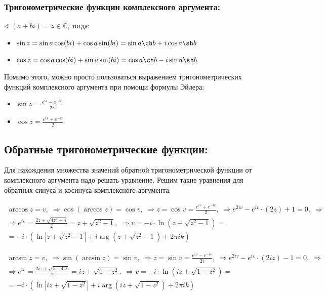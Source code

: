 \documentclass{article}
\begin{document}
\subsubsection{Тригонометрические функции комплексного аргумента:}

$\sphericalangle \: (a + bi) = z \in \mathbb{C}$, тогда:
\begin{itemize}
	\item $\sin z = \sin a \cos (bi) + \cos a \sin (bi) = \sin a \ch b + i\cos a \sh b$
	\item $\cos z = \cos a \cos (bi) + \sin a \sin (bi) = \cos a \ch b - i\sin a \sh b$
\end{itemize}


Помимо этого, можно просто пользоваться выражением тригонометрических функций комплексного аргумента при помощи формулы Эйлера:

\begin{itemize}
	\item $\sin z = \frac{e^{iz} - e^{-iz}}{2i}$
	\item $\cos z = \frac{e^{ix} + e^{-iz}}{2}$
\end{itemize}

\subsection{Обратные тригонометрические функции:}

Для нахождения множества значений обратной тригонометрической функции от комплексного аргумента надо решать уравнение. Решим такие уравнения для обратных синуса и косинуса комплексного аргумента:

\begin{equation*}
	\begin{aligned}
		\arccos z = v, \; \Rightarrow \cos(\arccos z) = \cos v, \; \Rightarrow z = \cos v = \frac{e^{iv} + e^{-iv}}{2},\; \Rightarrow e^{2iv} - e^{iv} \cdot (2z) + 1 = 0,\;\Rightarrow\\
		\Rightarrow e^{iv} = \frac{2z + \sqrt{4z^2 - 4}}{2} = z + \sqrt{z^2 - 1},\;\Rightarrow v = -i \cdot \ln \left(z + \sqrt{z^2 - 1}\right) =\\
		= -i \cdot \left(\ln |z + \sqrt{z^2 - 1}| + i \arg (z + \sqrt{z^2 - 1}) + 2\pi i k\right)
	\end{aligned}	
\end{equation*}

\begin{equation*}
	\begin{aligned}
		\arcsin z = v, \; \Rightarrow \sin(\arcsin z) = \sin v, \; \Rightarrow z = \sin v = \frac{e^{iv} - e^{-iv}}{2i},\; \Rightarrow e^{2iv} - e^{iv} \cdot (2iz) - 1 = 0,\;\Rightarrow\\
		\Rightarrow e^{iv} = \frac{2iz + \sqrt{4 - 4z^2}}{2} = iz + \sqrt{1 - z^2},\;\Rightarrow v = -i \cdot \ln \left(iz + \sqrt{1 - z^2}\right) =\\
		= -i \cdot \left(\ln |iz + \sqrt{1 - z^2}| + i \arg (iz + \sqrt{1 - z^2}) + 2\pi i k\right)
	\end{aligned}
\end{equation*}
\end{document}

